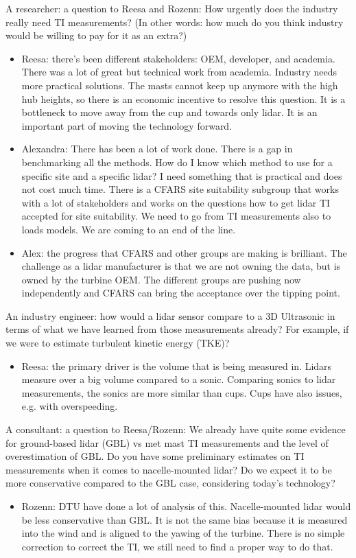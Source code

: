A researcher: a question to Reesa and Rozenn: How urgently does the industry really need TI measurements? (In other words: how much do you think industry would be willing to pay for it as an extra?)
\begin{itemize}
    \item Reesa: there’s been different stakeholders: OEM, developer, and academia. There was a lot of great but technical work from academia. Industry needs more practical solutions. The masts cannot keep up anymore with the high hub heights, so there is an economic incentive to resolve this question. It is a bottleneck to move away from the cup and towards only lidar. It is an important part of moving the technology forward. 
    \item Alexandra: There has been a lot of work done. There is a gap in benchmarking all the methods. How do I know which method to use for a specific site and a specific lidar? I need something that is practical and does not cost much time. There is a CFARS site suitability subgroup that works with a lot of stakeholders and works on the questions how to get lidar TI accepted for site suitability. We need to go from TI measurements also to loads models. We are coming to an end of the line. 
    \item Alex: the progress that CFARS and other groups are making is brilliant. The challenge as a lidar manufacturer is that we are not owning the data, but is owned by the turbine OEM. The different groups are pushing now independently and CFARS can bring the acceptance over the tipping point. 
\end{itemize}

An industry engineer: how would a lidar sensor compare to a 3D Ultrasonic in terms of what we have learned from those measurements already? For example, if we were to estimate turbulent kinetic energy (TKE)?
\begin{itemize}
    \item Reesa: the primary driver is the volume that is being measured in. Lidars measure over a big volume compared to a sonic. Comparing sonics to lidar measurements, the sonics are more similar than cups. Cups have also issues, e.g. with overspeeding. 
\end{itemize}

A consultant: a question to Reesa/Rozenn: We already have quite some evidence for ground-based lidar (GBL) vs met mast TI measurements and the level of overestimation of GBL. Do you have some preliminary estimates on TI measurements when it comes to nacelle-mounted lidar? Do we expect it to be more conservative compared to the GBL case, considering today's technology?
\begin{itemize}
    \item Rozenn: DTU have done a lot of analysis of this. Nacelle-mounted lidar would be less conservative than GBL. It is not the same bias because it is measured into the wind and is aligned to the yawing of the turbine. There is no simple correction to correct the TI, we still need to find a proper way to do that.
\end{itemize}

